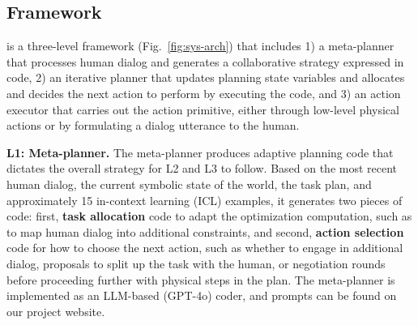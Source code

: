 \subsection{\ours{} Framework}
\methodname{} is a three-level framework (Fig.~\ref{fig:sys-arch}) that includes 1) a meta-planner that processes human dialog and generates a collaborative strategy expressed in code, 2) an iterative planner that updates planning state variables and allocates and decides the next action to perform by executing the code, and 3) an action executor that carries out the action primitive, either through low-level physical actions or by formulating a dialog utterance to the human.

\textbf{L1: Meta-planner.} The meta-planner produces adaptive planning code that dictates the overall strategy for L2 and L3 to follow. 
Based on the most recent human dialog, the current symbolic state of the world, the task plan, and approximately 15 in-context learning (ICL) examples, it generates two pieces of code: first, \textbf{task allocation} code to adapt the optimization computation, such as to map human dialog into additional constraints, and second, \textbf{action selection} code for how to choose the next action, such as whether to engage in additional dialog, proposals to split up the task with the human, or negotiation rounds before proceeding further with physical steps in the plan. The meta-planner is implemented as an LLM-based (GPT-4o) coder, and prompts can be found on our project website.\footnotemark[1]

